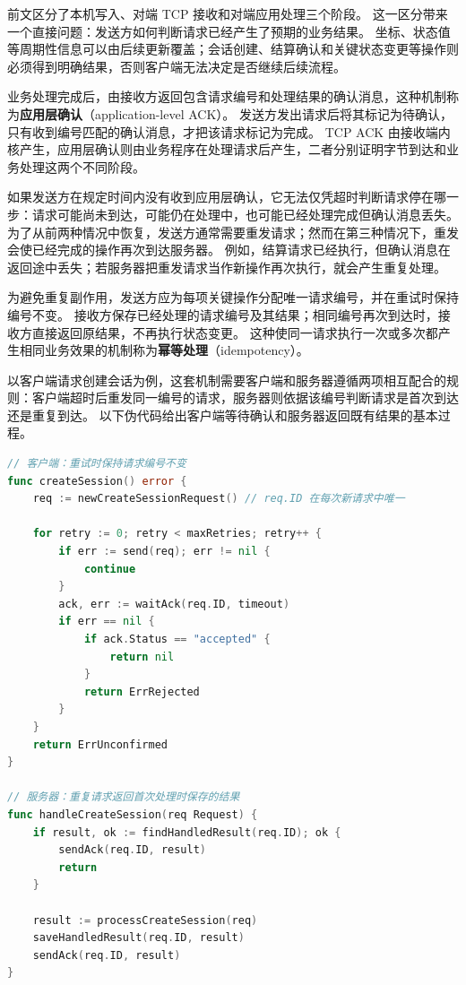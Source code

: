 前文区分了本机写入、对端 TCP 接收和对端应用处理三个阶段。
这一区分带来一个直接问题：发送方如何判断请求已经产生了预期的业务结果。
坐标、状态值等周期性信息可以由后续更新覆盖；会话创建、结算确认和关键状态变更等操作则必须得到明确结果，否则客户端无法决定是否继续后续流程。

业务处理完成后，由接收方返回包含请求编号和处理结果的确认消息，这种机制称为\textbf{应用层确认}（application-level ACK）。
发送方发出请求后将其标记为待确认，只有收到编号匹配的确认消息，才把该请求标记为完成。
TCP ACK 由接收端内核产生，应用层确认则由业务程序在处理请求后产生，二者分别证明字节到达和业务处理这两个不同阶段。

如果发送方在规定时间内没有收到应用层确认，它无法仅凭超时判断请求停在哪一步：请求可能尚未到达，可能仍在处理中，也可能已经处理完成但确认消息丢失。
为了从前两种情况中恢复，发送方通常需要重发请求；然而在第三种情况下，重发会使已经完成的操作再次到达服务器。
例如，结算请求已经执行，但确认消息在返回途中丢失；若服务器把重发请求当作新操作再次执行，就会产生重复处理。

为避免重复副作用，发送方应为每项关键操作分配唯一请求编号，并在重试时保持编号不变。
接收方保存已经处理的请求编号及其结果；相同编号再次到达时，接收方直接返回原结果，不再执行状态变更。
这种使同一请求执行一次或多次都产生相同业务效果的机制称为\textbf{幂等处理}（idempotency）。

以客户端请求创建会话为例，这套机制需要客户端和服务器遵循两项相互配合的规则：客户端超时后重发同一编号的请求，服务器则依据该编号判断请求是首次到达还是重复到达。
以下伪代码给出客户端等待确认和服务器返回既有结果的基本过程。

\begin{tcolorbox}[title=端到端确认与重复请求处理（概念示例）]
\begin{lstlisting}[style=codeblock, language=go]
// 客户端：重试时保持请求编号不变
func createSession() error {
    req := newCreateSessionRequest() // req.ID 在每次新请求中唯一

    for retry := 0; retry < maxRetries; retry++ {
        if err := send(req); err != nil {
            continue
        }
        ack, err := waitAck(req.ID, timeout)
        if err == nil {
            if ack.Status == "accepted" {
                return nil
            }
            return ErrRejected
        }
    }
    return ErrUnconfirmed
}

// 服务器：重复请求返回首次处理时保存的结果
func handleCreateSession(req Request) {
    if result, ok := findHandledResult(req.ID); ok {
        sendAck(req.ID, result)
        return
    }

    result := processCreateSession(req)
    saveHandledResult(req.ID, result)
    sendAck(req.ID, result)
}
\end{lstlisting}
\end{tcolorbox}

